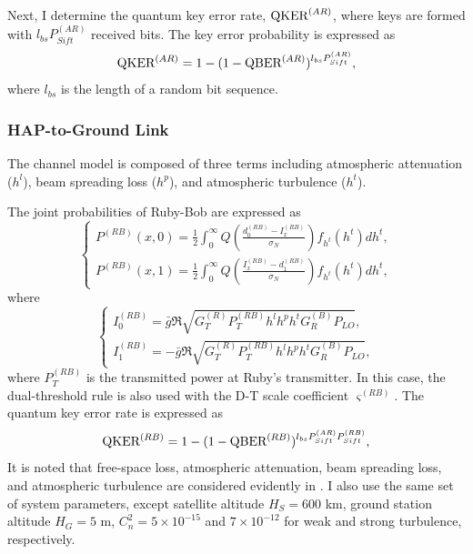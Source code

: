 \documentclass[conference]{IEEEtran}
\begin{document}
Next, I determine the quantum key error rate, $\textnormal{QKER}^{(AR)}$, where keys are formed with $l_{bs}P^{(AR)}_{Sift}$ received bits. The key error probability is expressed as
\begin{equation}
	\textnormal{QKER}^{(AR)}=1-(1-\textnormal{QBER}^{(AR)})^{l_{bs}P_{Sift}^{(AR)}},
\end{equation}
where $l_{bs}$ is the length of a random bit sequence. 

\subsubsection{HAP-to-Ground Link}
The channel model is composed of three terms including atmospheric attenuation ($h^l$), beam spreading loss ($h^p$), and atmospheric turbulence ($h^t$). 

The joint probabilities of Ruby-Bob are expressed as
\begin{equation}
\!
\begin{cases}
P^{(RB)}(x,0)=\frac{1}{2}\int_{0}^{\infty }Q\left ( \frac{d_0^{(RB)}-I_x^{(RB)}}{\sigma_N} \right )f_{h^t}(h^t)dh^t, \\
P^{(RB)}(x,1)=\frac{1}{2}\int_{0}^{\infty }Q\left ( \frac{I_x^{(RB)}-d_1^{(RB)}}{\sigma_N} \right )f_{h^t}(h^t)dh^t,
\end{cases}
\end{equation}
where
\begin{equation}
  \begin{cases}
    I_0^{(RB)}=\bar{g}\Re\sqrt{G_T^{(R)}P_T^{(RB)}h^{l}h^{p}h^{t}G_{R}^{(B)}P_{LO}},\\
    I_1^{(RB)}=-\bar{g}\Re\sqrt{G_T^{(R)}P_T^{(RB)}h^{l}h^{p}h^{t}G_{R}^{(B)}P_{LO}},
  \end{cases}
\end{equation}
where $P_T^{(RB)}$ is the transmitted power at Ruby's transmitter. In this case, the dual-threshold rule is also used with the D-T scale coefficient $\varsigma^{(RB)}$. The quantum key error rate is expressed as
\begin{equation}
	\textnormal{QKER}^{(RB)}=1-(1-\textnormal{QBER}^{(RB)})^{l_{bs}P_{Sift}^{(AR)}P_{Sift}^{(RB)}},
\end{equation}
It is noted that free-space loss, atmospheric attenuation, beam spreading loss, and atmospheric turbulence are considered evidently in \cite{Vu2019}. I also use the same set of system parameters, except satellite altitude $H_S=600$ km, ground station altitude $H_G=5$ m, $C_n^2=5\times 10^{-15}$ and $7\times 10^{-12}$ for weak and strong turbulence, respectively.
\end{document}
